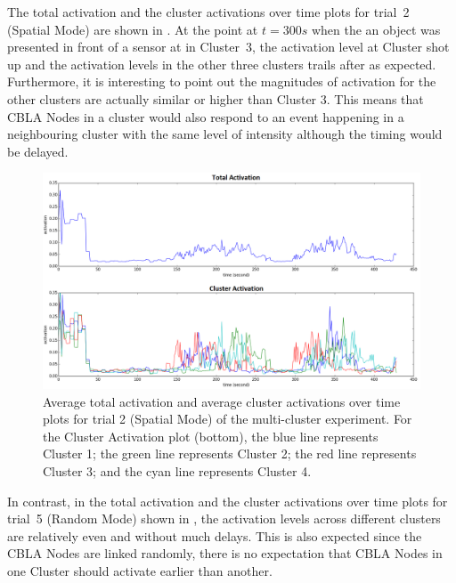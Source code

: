 The total activation and the cluster activations over time plots for trial~2 (Spatial Mode) are shown in . At the point at $t = 300s$ when the an object was presented in front of a sensor at in Cluster~3, the activation level at Cluster shot up and the activation levels in the other three clusters trails after as expected. Furthermore, it is interesting to point out the magnitudes of activation for the other clusters are actually similar or higher than Cluster 3. This means that CBLA Nodes in a cluster would also respond to an event happening in a neighbouring cluster with the same level of intensity although the timing would be delayed.

\begin{figure} [!htbp]
	\centering
	\includegraphics[width=1.0\textwidth]{"fig/validations/cbla_spatial_global_2015-11-16_14-33-11 - Metrics"}
	\caption[Average total activation and average cluster activations over time plots for trial 2 (Spatial Mode) of the multi-cluster experiment]{Average total activation and average cluster activations over time plots for trial 2 (Spatial Mode) of the multi-cluster experiment. For the Cluster Activation plot (bottom), the blue line represents Cluster 1; the green line represents Cluster 2; the red line represents Cluster 3; and the cyan line represents Cluster 4.}
	\label{fig:multi-cluster-results-spatial-2}
\end{figure}

In contrast, in the total activation and the cluster activations over time plots for trial~5 (Random Mode) shown in , the activation levels across different clusters are relatively even and without much delays. This is also expected since the CBLA Nodes are linked randomly, there is no expectation that CBLA Nodes in one Cluster should activate earlier than another.

